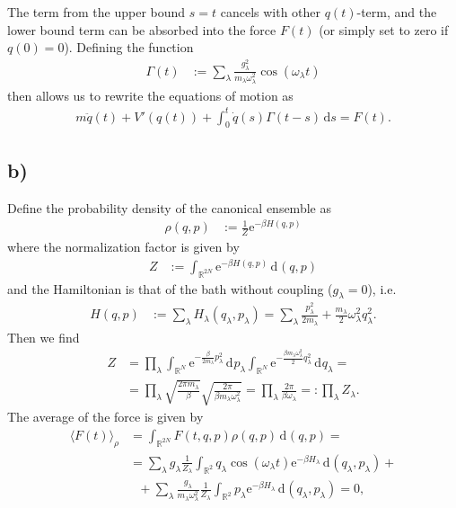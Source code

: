 \documentclass[english, parskip=full]{scrartcl}
\newcommand{\bra}{}
\newcommand{\intx}{}
\newcommand{\intr}{}
\newcommand{\e}{\text{e}}
\begin{document}
The term from the upper bound $s=t$ cancels with other $q(t)$-term, and the lower bound term can be absorbed into the force $F(t)$ (or simply set to zero if $q(0)=0$).
Defining the function
\begin{align}
\Gamma(t) &:= \sum_\lambda\frac{g_\lambda^2}{m_\lambda\omega_\lambda^2} \cos (\omega_\lambda t)
\end{align}
then allows us to rewrite the equations of motion as
\begin{align}
m\ddot{q}(t)+V'(q(t))+\intx\int_{0}^{t}\dot{q}(s)\Gamma(t-s)\, \mathrm{d}s=F(t).
\end{align}
\subsection*{b)}
Define the probability density of the canonical ensemble as 
\begin{align}
\rho(q,p)&:=\frac{1}{Z}\e^{-\beta H(q,p)}
\end{align}
where the normalization factor is given by
\begin{align}
Z&:=\intr\int_{\mathbb{R}^{2N}} \e^{-\beta H(q,p)} \, \mathrm{d}^{ }(q,p)
\end{align}
and the Hamiltonian is that of the bath without coupling ($g_\lambda=0$), i.e.
\begin{align}
H(q,p)&:=\sum_\lambda H_\lambda (q_\lambda,p_\lambda)=\sum_\lambda\frac{p_\lambda^2}{2m_\lambda}+\frac{m_\lambda}{2}\omega_\lambda^2q_\lambda^2.
\end{align}
Then we find
\begin{align}
Z&=\prod_\lambda\int_{\mathbb{R}^{N }} \e^{-\frac{\beta }{2m_\lambda}p_\lambda^2} \, \mathrm{d}^{ }p_\lambda \int_{\mathbb{R}^{N }} \e^{-\frac{\beta m_\lambda\omega_\lambda^2}{2}q_\lambda^2} \, \mathrm{d}^{ }q_\lambda=\\
&=\prod_\lambda\sqrt{\frac{2\pi m_\lambda}{\beta}}\sqrt{\frac{2\pi}{\beta m_\lambda\omega_\lambda^2}}=\prod_\lambda\frac{2\pi}{\beta\omega_\lambda}=:\prod_\lambda Z_\lambda.
\end{align}
The average of the force is given by
\begin{align}
\bra\langle F(t) \rangle_\rho&=\intr\int_{\mathbb{R}^{2N}} F(t,q,p)\rho(q,p) \, \mathrm{d}^{ }(q,p)=\\
&=\sum_\lambda g_\lambda\frac{1}{Z_\lambda}\intr\int_{\mathbb{R}^{2 }} q_\lambda\cos(\omega_\lambda t)\e^{-\beta H_\lambda} \, \mathrm{d}^{ }(q_\lambda,p_\lambda) +\\
&\ \ \ + \sum_\lambda \frac{g_\lambda}{m_\lambda\omega_\lambda^2}\frac{1}{Z_\lambda}\intr\int_{\mathbb{R}^{2 }} p_\lambda\e^{-\beta H_\lambda} \, \mathrm{d}^{ }(q_\lambda,p_\lambda)=0,
\end{align}
\end{document}

